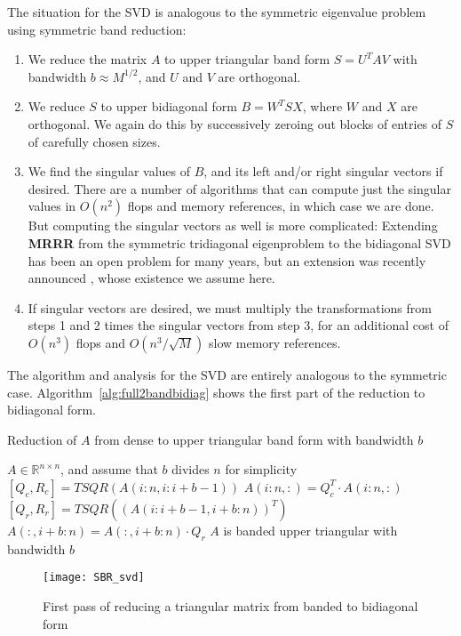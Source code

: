 \documentclass{article}
\theoremstyle{definition}
\begin{document}
The situation for the SVD is analogous to the symmetric eigenvalue problem using symmetric band reduction:
\begin{enumerate}
\item We reduce the matrix $A$ to upper triangular band form $S = U^TAV$ with bandwidth $b \approx M^{1/2}$, and $U$ and $V$ are orthogonal.
\item We reduce $S$ to upper bidiagonal form $B = W^TSX$, where $W$ and $X$ are orthogonal. We again do this by successively zeroing out blocks of
entries of $S$ of carefully chosen sizes.
\item We find the singular values of $B$, and its left and/or right singular vectors if desired. There are a number of algorithms that can compute
just the singular values in $O(n^2)$ flops and memory references, in which case we are done. But computing the singular vectors as well is more
complicated: Extending \textbf{MRRR} from the symmetric tridiagonal eigenproblem to the bidiagonal SVD has been an open problem for many years,
but an extension was recently announced \cite{Willems09}, whose existence we assume here.
\item If singular vectors are desired, we must multiply the transformations from steps 1 and 2 times the singular vectors from step 3, for an
additional cost of $O(n^3)$ flops and $O(n^3 / \sqrt{M})$ slow memory references.
\end{enumerate}

The algorithm and analysis for the SVD are entirely analogous to the symmetric case.  Algorithm~\ref{alg:full2bandbidiag} shows the first part of
the reduction to bidiagonal form.

\begin{algorithm}
\protect\caption{Reduction of $A$ from dense to upper triangular band form with bandwidth $b$}
\label{alg:full2bandbidiag}
\begin{algorithmic}[1]
\REQUIRE $A\in\mathbb{R}^{n\times n}$, and assume that $b$ divides $n$ for simplicity
        \STATE $[Q_c,R_c] = TSQR(A(i:n,i:i+b-1))$
        \STATE $A(i:n,:) = Q_c^T \cdot A(i:n,:)$
        \STATE $[Q_r,R_r] = TSQR((A(i:i+b-1,i+b:n))^T)$
        \STATE $A(:,i+b:n) = A(:,i+b:n) \cdot Q_r$
    \ENDFOR
\ENSURE $A$ is banded upper triangular with bandwidth $b$
\end{algorithmic}
\end{algorithm}

\begin{figure}
\centering
\texttt{[image: SBR\_svd]}
\caption{First pass of reducing a triangular matrix from banded to bidiagonal form}
\label{fig:SBR_svd}
\end{figure}
\end{document}
